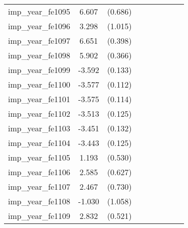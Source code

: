 {\begin{tabular}{l*{4}{cc}}
imp\_year\_fe1095&    6.607\sym{***}&  (0.686)&                  &         &                  &         &                  &         \\
imp\_year\_fe1096&    3.298\sym{**} &  (1.015)&                  &         &                  &         &                  &         \\
imp\_year\_fe1097&    6.651\sym{***}&  (0.398)&                  &         &                  &         &                  &         \\
imp\_year\_fe1098&    5.902\sym{***}&  (0.366)&                  &         &                  &         &                  &         \\
imp\_year\_fe1099&   -3.592\sym{***}&  (0.133)&                  &         &                  &         &                  &         \\
imp\_year\_fe1100&   -3.577\sym{***}&  (0.112)&                  &         &                  &         &                  &         \\
imp\_year\_fe1101&   -3.575\sym{***}&  (0.114)&                  &         &                  &         &                  &         \\
imp\_year\_fe1102&   -3.513\sym{***}&  (0.125)&                  &         &                  &         &                  &         \\
imp\_year\_fe1103&   -3.451\sym{***}&  (0.132)&                  &         &                  &         &                  &         \\
imp\_year\_fe1104&   -3.443\sym{***}&  (0.125)&                  &         &                  &         &                  &         \\
imp\_year\_fe1105&    1.193\sym{*}  &  (0.530)&                  &         &                  &         &                  &         \\
imp\_year\_fe1106&    2.585\sym{***}&  (0.627)&                  &         &                  &         &                  &         \\
imp\_year\_fe1107&    2.467\sym{***}&  (0.730)&                  &         &                  &         &                  &         \\
imp\_year\_fe1108&   -1.030         &  (1.058)&                  &         &                  &         &                  &         \\
imp\_year\_fe1109&    2.832\sym{***}&  (0.521)&                  &         &                  &         &                  &         \\

\end{tabular}}
